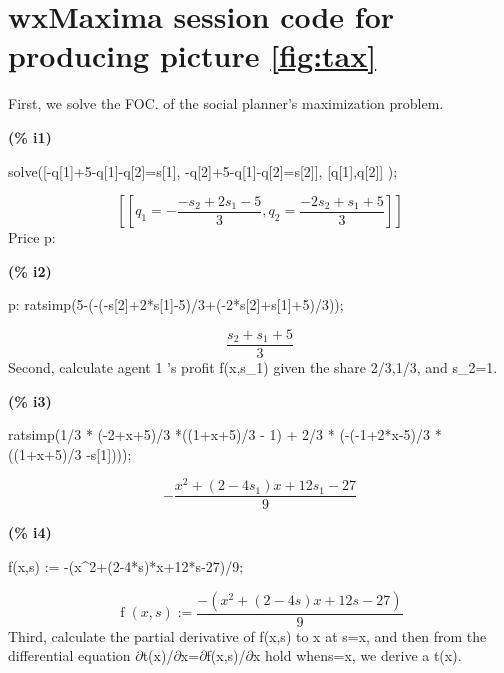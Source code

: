 
\chapter{wxMaxima session code for producing picture \ref{fig:tax}} %

\label{Appendix_B} %

First, we solve the FOC. of the social planner's maximization problem. 


\noindent
\begin{minipage}[t]{8ex}\color{red}\bf
(\% i1) 
\end{minipage}
\begin{minipage}[t]{\textwidth}\color{blue}
solve([-q[1]+5-q[1]-q[2]=s[1], -q[2]+5-q[1]-q[2]=s[2]], [q[1],q[2]] );
\end{minipage}
\[\displaystyle
\tag{\% o1} 
[[{q_1}=-\frac{-{s_2}+2 {s_1}-5}{3},{q_2}=\frac{-2 {s_2}+{s_1}+5}{3}]]\mbox{}
\]
Price p: 


\noindent
\begin{minipage}[t]{8ex}\color{red}\bf
(\% i2)
\end{minipage}
\begin{minipage}[t]{\textwidth}\color{blue}
p: ratsimp(5-(-(-s[2]+2*s[1]-5)/3+(-2*s[2]+s[1]+5)/3));
\end{minipage}
\[\displaystyle
\tag{p}
\frac{{s_2}+{s_1}+5}{3}\mbox{}
\]
Second, calculate agent 1 's profit f(x,s\_1) given the share 2/3,1/3, and s\_2=1. 


\noindent
\begin{minipage}[t]{8ex}\color{red}\bf
(\% i3)
\end{minipage}
\begin{minipage}[t]{\textwidth}\color{blue}
 ratsimp(1/3 * (-2+x+5)/3 *((1+x+5)/3 - 1)  + 2/3 * (-(-1+2*x-5)/3 *((1+x+5)/3 -s[1])));
\end{minipage}
\[\displaystyle
\tag{\% o3} 
-\frac{{{x}^{2}}+\left( 2-4 {s_1}\right)  x+12 {s_1}-27}{9}\mbox{}
\]


\noindent
\begin{minipage}[t]{8ex}\color{red}\bf
(\% i4)
\end{minipage}
\begin{minipage}[t]{\textwidth}\color{blue}
f(x,s) := -(x\^{}2+(2-4*s)*x+12*s-27)/9;
\end{minipage}
\[\displaystyle
\tag{\% o4} 
\operatorname{f}\left( x,s\right) :=\frac{-\left( {{x}^{2}}+\left( 2-4 s\right)  x+12 s-27\right) }{9}\mbox{}
\]
Third, calculate the partial derivative of f(x,s) to x at s=x, and then from the differential equation \ensuremath{\partial}t(x)/\ensuremath{\partial}x=\ensuremath{\partial}f(x,s)/\ensuremath{\partial}x hold whens=x, we derive a t(x). 


